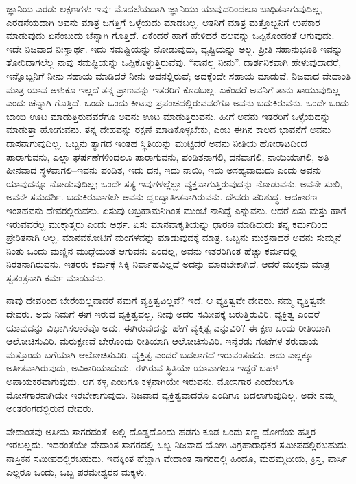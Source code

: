 ಜ್ಞಾನಿಯ ಎರಡು ಲಕ್ಷಣಗಳು ಇವು: ಮೊದಲೆಯದಾಗಿ ಜ್ಞಾನಿಯು ಯಾವುದರಿಂದಲೂ ಬಾಧಿತನಾಗುವುದಿಲ್ಲ, ಎರಡನೆಯದಾಗಿ ಅವನು ಮಾತ್ರ ಜಗತ್ತಿಗೆ ಒಳ್ಳೆಯದು ಮಾಡಬಲ್ಲ. ಆತನಿಗೆ ಮಾತ್ರ ಮತ್ತೊಬ್ಬನಿಗೆ ಉಪಕಾರ ಮಾಡುವುದು ಏನೆಂಬುದು ಚೆನ್ನಾಗಿ ಗೊತ್ತಿದೆ. ಏಕೆಂದರೆ ಹಾಗೆ ಹೇಳಿದರೆ ಹಲವನ್ನು ಒಪ್ಪಿಕೊಂಡಂತೆ ಆಗುವುದು. ಇದೇ ನಿಜವಾದ ನಿಃಸ್ವಾರ್ಥ. ಇದು ಸಮಷ್ಟಿಯನ್ನು ನೋಡುವುದು, ವ್ಯಷ್ಟಿಯನ್ನು ಅಲ್ಲ. ಪ್ರೀತಿ ಸಹಾನುಭೂತಿ ಇವನ್ನು ತೋರಿದಾಗಲೆಲ್ಲ ನಾವು ಸಮಷ್ಟಿಯನ್ನು ಒಪ್ಪಿಕೊಳ್ಳುತ್ತಿರುವೆವು. “ನಾನಲ್ಲ ನೀನು”. ದಾರ್ಶನಿಕವಾಗಿ ಹೇಳುವುದಾದರೆ, ಇನ್ನೊಬ್ಬನಿಗೆ ನೀನು ಸಹಾಯ ಮಾಡಿದರೆ ನೀನು ಅವನಲ್ಲಿರುವೆ; ಅದಕ್ಕೆಂದೇ ಸಹಾಯ ಮಾಡುವೆ. ನಿಜವಾದ ವೇದಾಂತಿ ಮಾತ್ರ ಯಾವ ಅಳುಕೂ ಇಲ್ಲದೆ ತನ್ನ ಪ್ರಾಣವನ್ನು ಇತರರಿಗೆ ಕೊಡಬಲ್ಲ. ಏಕೆಂದರೆ ಅವನಿಗೆ ತಾನು ಸಾಯುವುದಿಲ್ಲ ಎಂದು ಚೆನ್ನಾಗಿ ಗೊತ್ತಿದೆ. ಒಂದೇ ಒಂದು ಕೀಟವು ಪ್ರಪಂಚದಲ್ಲಿರುವವರೆಗೂ ಅವನು ಬದುಕಿರುವನು. ಒಂದೇ ಒಂದು ಬಾಯಿ ಊಟ ಮಾಡುತ್ತಿರುವವರೆಗೂ ಅವನು ಊಟ ಮಾಡುತ್ತಿರುವನು. ಹೀಗೆ ಅವನು ಇತರರಿಗೆ ಒಳ್ಳೆಯದನ್ನು ಮಾಡುತ್ತಾ ಹೋಗುವನು. ತನ್ನ ದೇಹವನ್ನು ರಕ್ಷಣೆ ಮಾಡಿಕೊಳ್ಳಬೇಕು, ಎಂಬ ಈಗಿನ ಕಾಲದ ಭಾವನೆಗೆ ಅವನು ದಾಸನಾಗುವುದಿಲ್ಲ. ಒಬ್ಬನು ತ್ಯಾಗದ ಇಂತಹ ಸ್ಥಿತಿಯನ್ನು ಮುಟ್ಟಿದರೆ ಅವನು ನೀತಿಯ ಹೋರಾಟದಿಂದ ಪಾರಾಗುವನು, ಎಲ್ಲಾ ಘರ್ಷಣೆಗಳಿಂದಲೂ ಪಾರಾಗುವನು, ಪಂಡಿತನಾಗಲಿ, ದನವಾಗಲಿ, ನಾಯಿಯಾಗಲಿ, ಅತಿ ಹೀನವಾದ ಸ್ಥಳವಾಗಲಿ–ಇವನು ಪಂಡಿತ, ಇದು ದನ, ಇದು ನಾಯಿ, ಇದು ಅಸಹ್ಯವಾದುದು ಎಂದು ಅವನು ಯಾವುದನ್ನೂ ನೋಡುವುದಿಲ್ಲ; ಒಂದೇ ಸತ್ಯ ಇವುಗಳಲ್ಲೆಲ್ಲಾ ವ್ಯಕ್ತವಾಗುತ್ತಿರುವುದನ್ನು ನೋಡುವನು. ಅವನೇ ಸುಖಿ, ಅವನೇ ಸಮದರ್ಶಿ. ಬದುಕಿರುವಾಗಲೇ ಅವನು ದ್ವಂದ್ವಾತೀತನಾಗಿರುವನು. ದೇವರು ಪರಿಶುದ್ಧ. ಆದಕಾರಣ ಇಂತಹವನು ದೇವರಲ್ಲಿರುವನು. ಏಸುವು ಅಬ್ರಹಾಮನಿಗಿಂತ ಮುಂಚೆ ನಾನಿದ್ದೆ ಎನ್ನುವನು. ಆದರೆ ಏಸು ಮತ್ತು ಹಾಗೆ ಇರುವವರೆಲ್ಲ ಮುಕ್ತಾತ್ಮರು ಎಂದು ಅರ್ಥ. ಏಸು ಮಾನವಾಕೃತಿಯನ್ನು ಧಾರಣ ಮಾಡಿದುದು ತನ್ನ ಕರ್ಮದಿಂದ ಪ್ರೇರಿತನಾಗಿ ಅಲ್ಲ. ಮಾನವಕೋಟಿಗೆ ಮಂಗಳವನ್ನು ಮಾಡುವುದಕ್ಕೆ ಮಾತ್ರ. ಒಬ್ಬನು ಮುಕ್ತನಾದರೆ ಅವನು ಸುಮ್ಮನೆ ನಿಂತು ಒಂದು ಮಣ್ಣಿನ ಮುದ್ದೆಯಂತೆ ಆಗುವನು ಎಂದಲ್ಲ, ಅವನು ಇತರರಿಗಿಂತ ಹೆಚ್ಚು ಕರ್ಮದಲ್ಲಿ ನಿರತನಾಗಿರುವನು. ಇತರರು ಕರ್ಮಕ್ಕೆ ಸಿಕ್ಕಿ ನಿರ್ವಾಹವಿಲ್ಲದೆ ಅದನ್ನು ಮಾಡಬೇಕಾಗಿದೆ. ಆದರೆ ಮುಕ್ತನು ಮಾತ್ರ ಸ್ವತಂತ್ರನಾಗಿ ಕರ್ಮ ಮಾಡುವನು.

ನಾವು ದೇವರಿಂದ ಬೇರೆಯಲ್ಲವಾದರೆ ನಮಗೆ ವ್ಯಕ್ತಿತ್ವವಿಲ್ಲವೆ? ಇದೆ. ಆ ವ್ಯಕ್ತಿತ್ವವೇ ದೇವರು. ನಮ್ಮ ವ್ಯಕ್ತಿತ್ವವೇ ದೇವರು. ಅದು ನಿಮಗೆ ಈಗ ಇರುವ ವ್ಯಕ್ತಿತ್ವವಲ್ಲ. ನೀವು ಅದರ ಸಮೀಪಕ್ಕೆ ಬರುತ್ತಿರುವಿರಿ. ವ್ಯಕ್ತಿತ್ವ ಎಂದರೆ ಯಾವುದನ್ನು ವಿಭಾಗಿಸಲಾರೆವೊ ಅದು. ಈಗಿರುವುದನ್ನು ಹೇಗೆ ವ್ಯಕ್ತಿತ್ವ ಎನ್ನುವಿರಿ? ಈ ಕ್ಷಣ ಒಂದು ರೀತಿಯಾಗಿ ಆಲೋಚಿಸುವಿರಿ. ಮರುಕ್ಷಣವೆ ಬೇರೊಂದು ರೀತಿಯಾಗಿ ಆಲೋಚಿಸುವಿರಿ. ಇನ್ನೆರಡು ಗಂಟೆಗಳ ತರುವಾಯ ಮತ್ತೊಂದು ಬಗೆಯಾಗಿ ಆಲೋಚಿಸುವಿರಿ. ವ್ಯಕ್ತಿತ್ವ ಎಂದರೆ ಬದಲಾಗದೆ ಇರುವಂತಹದು. ಅದು ಎಲ್ಲಕ್ಕೂ ಅತೀತವಾಗಿರುವುದು, ಅವಿಕಾರಿಯಾದುದು. ಈಗಿರುವ ಸ್ಥಿತಿಯೇ ಯಾವಾಗಲೂ ಇದ್ದರೆ ಬಹಳ ಅಪಾಯಕರವಾಗುವುದು. ಆಗ ಕಳ್ಳ ಎಂದಿಗೂ ಕಳ್ಳನಾಗಿಯೇ ಇರುವನು. ಮೋಸಗಾರ ಎಂದೆಂದಿಗೂ ಮೋಸಗಾರನಾಗಿಯೇ ಇರಬೇಕಾಗುವುದು. ನಿಜವಾದ ವ್ಯಕ್ತಿತ್ವವಾದರೊ ಎಂದಿಗೂ ಬದಲಾಗುವುದಿಲ್ಲ. ಅದೇ ನಮ್ಮ ಅಂತರಂಗದಲ್ಲಿರುವ ದೇವರು.

ವೇದಾಂತವು ಅಸೀಮ ಸಾಗರದಂತೆ. ಅಲ್ಲಿ ದೊಡ್ಡದೊಂದು ಹಡಗು ಕೂಡ ಒಂದು ಸಣ್ಣ ದೋಣಿಯ ಹತ್ತಿರ ಇರಬಲ್ಲದು. ಇದರಂತೆಯೇ ವೇದಾಂತ ಸಾಗರದಲ್ಲಿ ಒಬ್ಬ ನಿಜವಾದ ಯೋಗಿ ವಿಗ್ರಹಾರಾಧಕರ ಸಮೀಪದಲ್ಲಿರಬಹುದು, ನಾಸ್ತಿಕನ ಸಮೀಪದಲ್ಲಿರಬಹುದು. ಇದಕ್ಕಿಂತ ಹೆಚ್ಚಾಗಿ ವೇದಾಂತ ಸಾಗರದಲ್ಲಿ ಹಿಂದೂ, ಮಹಮ್ಮದೀಯ, ಕ್ರಿಸ್ತ, ಪಾರ್ಸಿ ಎಲ್ಲರೂ ಒಂದು, ಒಬ್ಬ ಪರಮೇಶ್ವರನ ಮಕ್ಕಳು.

